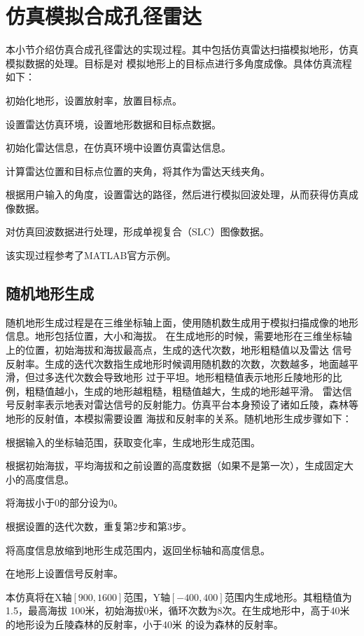 \documentclass{xduugthesis}
\begin{document}
\section{仿真模拟合成孔径雷达}\label{simulation_big_section}
本小节介绍仿真合成孔径雷达的实现过程。其中包括仿真雷达扫描模拟地形，仿真模拟数据的处理。目标是对
模拟地形上的目标点进行多角度成像。具体仿真流程如下：
\begin{compactenum}
	\item 初始化地形，设置放射率，放置目标点。
	\item 设置雷达仿真环境，设置地形数据和目标点数据。
	\item 初始化雷达信息，在仿真环境中设置仿真雷达信息。
	\item 计算雷达位置和目标点位置的夹角，将其作为雷达天线夹角。
	\item 根据用户输入的角度，设置雷达的路径，然后进行模拟回波处理，从而获得仿真成像数据。
	\item 对仿真回波数据进行处理，形成单视复合（SLC）图像数据。
\end{compactenum}\par
该实现过程参考了MATLAB官方示例\cite{SAR_Simulation}。
\subsection{随机地形生成}
随机地形生成过程是在三维坐标轴上面，使用随机数生成用于模拟扫描成像的地形信息。地形包括位置，大小和海拔。
在生成地形的时候，需要地形在三维坐标轴上的位置，初始海拔和海拔最高点，生成的迭代次数，地形粗糙值以及雷达
信号反射率。生成的迭代次数指生成地形时候调用随机数的次数，次数越多，地面越平滑，但过多迭代次数会导致地形
过于平坦。地形粗糙值表示地形丘陵地形的比例，粗糙值越小，生成的地形越粗糙，粗糙值越大，生成的地形越平滑。
雷达信号反射率表示地表对雷达信号的反射能力。仿真平台本身预设了诸如丘陵，森林等地形的反射值，本模拟需要设置
海拔和反射率的关系。随机地形生成步骤如下：
\begin{compactenum}
	\item 根据输入的坐标轴范围，获取变化率，生成地形生成范围。
	\item 根据初始海拔，平均海拔和之前设置的高度数据（如果不是第一次），生成固定大小的高度信息。
	\item 将海拔小于0的部分设为0。
	\item 根据设置的迭代次数，重复第2步和第3步。
	\item 将高度信息放缩到地形生成范围内，返回坐标轴和高度信息。
	\item 在地形上设置信号反射率。
\end{compactenum}\par
本仿真将在X轴$[900, 1600]$范围，Y轴$[-400, 400]$范围内生成地形。其粗糙值为1.5，最高海拔
100米，初始海拔0米，循环次数为8次。在生成地形中，高于40米的地形设为丘陵森林的反射率，小于40米
的设为森林的反射率。
\end{document}
